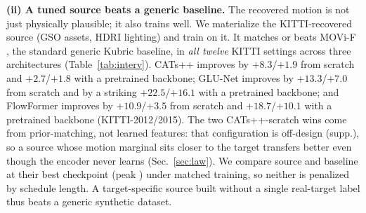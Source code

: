 \begin{table}[t]
\centering
\caption{\textbf{A target-tuned source beats the generic baseline.} Peak \pck{}
on KITTI of the render-free \emph{tuned} source (the KITTI-recovered generator,
GSO assets $+$ HDRI) vs.\ the generic MOVi-F baseline \cite{greff2021kubric},
by architecture and backbone (the \emph{scratch} rows train the backbone from
scratch; \emph{pretrained} is a frozen pretrained backbone). $\Delta =$ tuned $-$
MOVi-F; bold marks a win. The tuned source wins
all $12$ KITTI cells. On the semantic \textsc{tss} benchmark (right; pretrained
backbone), the target-matched source is instead \emph{near-static}, and it too
beats MOVi-F on all three architectures. For the configurations that learn, this is learned-feature
transfer; even for the off-design CATs++-from-scratch config (supp.)
the target-matched source wins, by prior-matching rather than learned features
(Sec.~\ref{sec:law}).}
\label{tab:interv}
\setlength{\tabcolsep}{5pt}
\resizebox{\textwidth}{!}{}
\end{table}

\noindent\textbf{(ii) A tuned source beats a generic baseline.}
The recovered motion is not just physically plausible; it also trains well. We
materialize the KITTI-recovered source (GSO assets, HDRI lighting) and train on
it. It matches or beats MOVi-F \cite{greff2021kubric}, the standard generic
Kubric baseline, in \emph{all twelve} KITTI settings across three architectures
(Table~\ref{tab:interv}). CATs++ improves by $+8.3$/$+1.9$ from scratch and
$+2.7$/$+1.8$ with a pretrained backbone; GLU-Net improves by $+13.3$/$+7.0$
from scratch and by a striking $+22.5$/$+16.1$ with a pretrained backbone; and
FlowFormer improves by $+10.9$/$+3.5$ from scratch and $+18.7$/$+10.1$ with a
pretrained backbone (KITTI-2012/2015). The two CATs++-scratch wins come from prior-matching, not
learned features: that configuration is off-design (supp.),
so a source whose motion marginal sits closer to the target transfers better
even though the encoder never learns (Sec.~\ref{sec:law}). We compare source and
baseline at their best checkpoint (peak \pck) under matched training, so neither
is penalized by schedule length. A target-specific source built without a single
real-target label thus beats a generic synthetic dataset.

